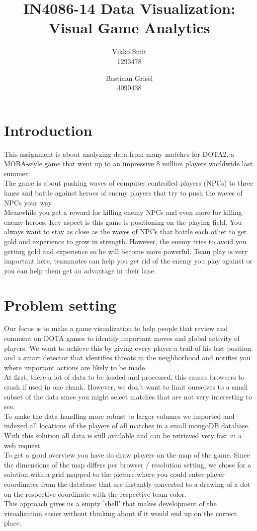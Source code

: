 \documentclass[a4paper]{article}
\title{IN4086-14  Data Visualization: Visual Game Analytics} %
\author{Vikko Smit\\ %
1293478
\and
Bastiaan Gris\`el\\
4090438
}
\theoremstyle{plain} %
\theoremstyle{definition} %
\begin{document}
\maketitle %
\section*{Introduction}
This assignment is about analyzing data from many matches for DOTA2, a MOBA-style game that went up to an impressive 8 million players worldwide last summer.\\ The game is about pushing waves of computer controlled players (NPCs) to three lanes and battle against heroes of enemy players that try to push the waves of NPCs your way.\\ Meanwhile you get a reward for killing enemy NPCs and even more for killing enemy heroes. Key aspect is this game is positioning on the playing field. You always want to stay as close as the waves of NPCs that battle each other to get gold and experience to grow in strength. However, the enemy tries to avoid you getting gold and experience so he will become more powerful. Team play is very important here, teammates can help you get rid of the enemy you play against or you can help them get an advantage in their lane. 
\section*{Problem setting}
Our focus is to make a game visualization to help people that review and comment on DOTA games to identify important moves and global activity of players. We want to achieve this by giving every player a trail of his last position and a smart detector that identifies threats in the neighborhood and notifies you where important actions are likely to be made.\\
At first, there a lot of data to be loaded and processed, this causes browsers to crash if used in one chunk. However, we don't want to limit ourselves to a small subset of the data since you might select matches that are not very interesting to see.\\
To make the data handling more robust to larger volumes we imported and indexed all locations of the players of all matches in a small mongoDB database. With this solution all data is still available and can be retrieved very fast in a web request.\\
To get a good overview you have do draw players on the map of the game. Since the dimensions of the map differs per browser / resolution setting, we chose for a solution with a grid mapped to the picture where you could enter player coordinates from the database that are instantly converted to a drawing of a dot on the respective coordinate with the respective team color.\\
This approach gives us a empty 'shell' that makes development of the visualization easier without thinking about if it would end up on the correct place.
\end{document}

